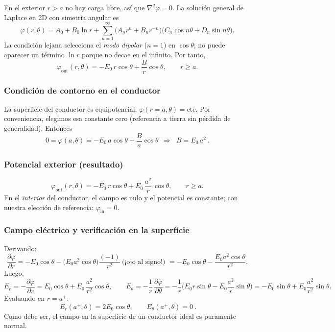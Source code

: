 \documentclass{article}
\begin{document}
En el exterior $r>a$ no hay carga libre, así que $\nabla^2\varphi=0$. La solución general de Laplace en 2D con simetría angular es
\[
\varphi(r,\theta)=A_0+B_0\ln r+\sum_{n=1}^\infty\big(A_n r^{n}+B_n r^{-n}\big)\big(C_n\cos n\theta+D_n\sin n\theta\big).
\]
La condición lejana selecciona el \emph{modo dipolar} ($n=1$) en $\cos\theta$; no puede aparecer un término $\ln r$ porque no decae en el infinito. Por tanto,
\[
\boxed{\quad \varphi_{\text{out}}(r,\theta)=-E_0\,r\cos\theta+\frac{B}{r}\cos\theta,\qquad r\ge a.\quad}
\]

\subsubsection*{Condición de contorno en el conductor}
La superficie del conductor es equipotencial: $\varphi(r=a,\theta)=\text{cte}$. Por conveniencia, elegimos esa constante cero (referencia a tierra sin pérdida de generalidad). Entonces
\[
0=\varphi(a,\theta)=-E_0\,a\cos\theta+\frac{B}{a}\cos\theta
\ \ \Longrightarrow\ \
\boxed{\,B=E_0\,a^{2}\,}.
\]

\subsubsection*{Potencial exterior (resultado)}
\[
\boxed{\;
\varphi_{\text{out}}(r,\theta)
=-E_0\,r\cos\theta+E_0\,\frac{a^{2}}{r}\,\cos\theta,\qquad r\ge a.\;}
\]
En el \emph{interior} del conductor, el campo es nulo y el potencial es constante; con nuestra elección de referencia: $\varphi_{\text{in}}=0$.

\subsubsection*{Campo eléctrico y verificación en la superficie}
Derivando:
\[
\frac{\partial\varphi}{\partial r}
=-E_0\cos\theta-\Big(E_0 a^{2}\cos\theta\Big)\frac{(-1)}{r^{2}}\ \text{(¡ojo al signo!) }
=-E_0\cos\theta-\frac{E_0 a^{2}\cos\theta}{r^{2}}.
\]
Luego,
\[
E_r=-\frac{\partial\varphi}{\partial r}=E_0\cos\theta+E_0\,\frac{a^{2}}{r^{2}}\cos\theta,\qquad
E_\theta=-\frac{1}{r}\,\frac{\partial\varphi}{\partial\theta}
=-\frac{1}{r}\Big(E_0 r\sin\theta - E_0\frac{a^{2}}{r}\sin\theta\Big)
= -E_0\sin\theta + E_0 \frac{a^{2}}{r^{2}}\sin\theta.
\]
Evaluando en $r=a^{+}$:
\[
\boxed{\ E_r(a^{+},\theta)=2E_0\cos\theta,\qquad E_\theta(a^{+},\theta)=0\ }.
\]
Como debe ser, el campo en la superficie de un conductor ideal es puramente normal.
\end{document}
